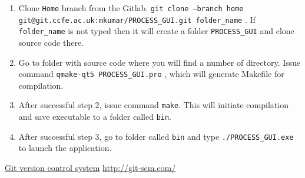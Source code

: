 \documentclass[11pt,a4paper]{report}
\begin{document}
\begin{enumerate}
\item    Clone \texttt{Home} branch from the Gitlab.   \texttt{git clone --branch home git@git.ccfe.ac.uk:mkumar/PROCESS\_GUI.git folder\_name} . If \texttt{folder\_name} is not typed then it will create a folder \texttt{PROCESS\_GUI} and clone source code there.

\item    Go to folder with source code where you will find a number of directory. Issue command   \texttt{qmake-qt5 PROCESS\_GUI.pro}  , which will generate Makefile for compilation.

\item After successful step 2, issue command \texttt{make}. This will initiate compilation and save executable to a folder called \texttt{bin}.

\item    After successful step 3, go to folder called \texttt{bin} and type  \texttt{./PROCESS\_GUI.exe} to launch the application.

\end{enumerate}


\begin{thebibliography}{99}
\raggedright

\href{http://git-scm.com/}{Git version control system}
\url{http://git-scm.com/}


\end{thebibliography}
\end{document}
